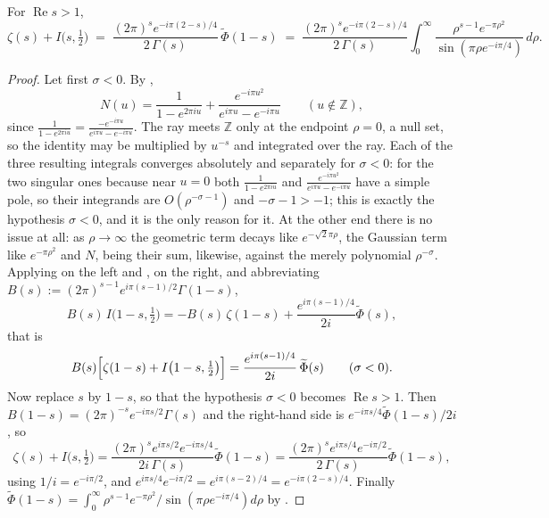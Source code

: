 \begin{theorem}
\label{thm:rsz_mellin}
\leanok
{}
For $\operatorname{Re}s>1$,
\[
  \zeta(s)+I\bigl(s,\tfrac12\bigr)
   \;=\;\frac{(2\pi)^{s}e^{-i\pi(2-s)/4}}{2\,\Gamma(s)}\,\widetilde\Phi(1-s)
   \;=\;\frac{(2\pi)^{s}e^{-i\pi(2-s)/4}}{2\,\Gamma(s)}
        \int_{0}^{\infty}\frac{\rho^{s-1}e^{-\pi\rho^{2}}}{\sin(\pi\rho e^{-i\pi/4})}\,d\rho .
\]
\end{theorem}

\begin{proof}
\leanok
{}
Let first $\sigma<0$.  By ,
\[
  N(u)=\frac1{1-e^{2\pi iu}}+\frac{e^{-i\pi u^{2}}}{e^{i\pi u}-e^{-i\pi u}}
  \qquad(u\notin\mathbb{Z}),
\]
since $\frac1{1-e^{2\pi iu}}=\frac{-e^{-i\pi u}}{e^{i\pi u}-e^{-i\pi u}}$.  The ray meets
$\mathbb{Z}$ only at the endpoint $\rho=0$, a null set, so the identity may be multiplied by
$u^{-s}$ and integrated over the ray.  Each of the three resulting integrals converges
absolutely and separately for $\sigma<0$: for the two singular ones because near $u=0$ both
$\frac1{1-e^{2\pi iu}}$ and $\frac{e^{-i\pi u^{2}}}{e^{i\pi u}-e^{-i\pi u}}$ have a simple
pole, so their integrands are $O(\rho^{-\sigma-1})$ and $-\sigma-1>-1$; this is exactly the
hypothesis $\sigma<0$, and it is the only reason for it.  At the other end there is no issue
at all: as $\rho\to\infty$ the geometric term decays like $e^{-\sqrt2\pi\rho}$, the Gaussian
term like $e^{-\pi\rho^{2}}$ and $N$, being their sum, likewise, against the merely polynomial
$\rho^{-\sigma}$.  Applying
 on the left and ,
 on the right, and abbreviating
$B(s):=(2\pi)^{s-1}e^{i\pi(s-1)/2}\Gamma(1-s)$,
\[
  B(s)\,I\bigl(1-s,\tfrac12\bigr)
   =-B(s)\,\zeta(1-s)+\frac{e^{i\pi(s-1)/4}}{2i}\widetilde\Phi(s),
\]
that is
\begin{equation}
  B(s)\Bigl[\zeta(1-s)+I\bigl(1-s,\tfrac12\bigr)\Bigr]
   =\frac{e^{i\pi(s-1)/4}}{2i}\,\widetilde\Phi(s)\qquad(\sigma<0).
  \label{eq:rsz_mellin_raw}
\end{equation}
Now replace $s$ by $1-s$, so that the hypothesis $\sigma<0$ becomes
$\operatorname{Re}s>1$.  Then $B(1-s)=(2\pi)^{-s}e^{-i\pi s/2}\Gamma(s)$ and the right-hand
side is $e^{-i\pi s/4}\widetilde\Phi(1-s)/2i$, so
\[
  \zeta(s)+I\bigl(s,\tfrac12\bigr)
   =\frac{(2\pi)^{s}e^{i\pi s/2}e^{-i\pi s/4}}{2i\,\Gamma(s)}\widetilde\Phi(1-s)
   =\frac{(2\pi)^{s}e^{i\pi s/4}e^{-i\pi/2}}{2\,\Gamma(s)}\widetilde\Phi(1-s),
\]
using $1/i=e^{-i\pi/2}$, and $e^{i\pi s/4}e^{-i\pi/2}=e^{i\pi(s-2)/4}=e^{-i\pi(2-s)/4}$.
Finally $\widetilde\Phi(1-s)=\int_{0}^{\infty}\rho^{s-1}e^{-\pi\rho^{2}}
/\sin(\pi\rho e^{-i\pi/4})d\rho$ by .
\end{proof}

